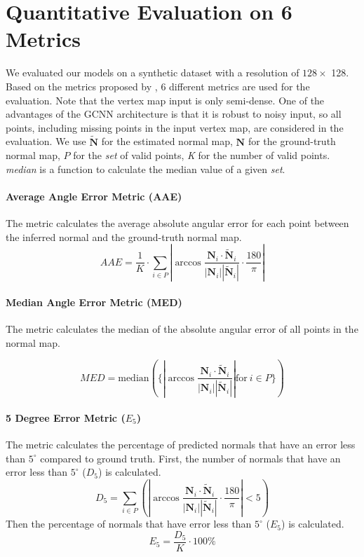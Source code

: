 \section{Quantitative Evaluation on 6 Metrics}
We evaluated our models on a synthetic dataset with a resolution of $ 128 \times $ 128. 
Based on the metrics proposed by \cite{geometry_based_solution}, 6 different metrics are used for the evaluation. Note that the vertex map input is only semi-dense. One of the advantages of the GCNN architecture is that it is robust to noisy input, so all points, including missing points in the input vertex map, are considered in the evaluation. We use $\tilde{\textbf{N}}$ for the estimated normal map, $ \textbf{N} $ for the ground-truth normal map, $ P $ for the \textit{set} of valid points, \textit{K} for the number of valid points. \textit{median} is a function to calculate the median value of a given \textit{set}.



\paragraph{Average Angle Error Metric (AAE)}
The metric calculates the average absolute angular error for each point between the inferred normal and the ground-truth normal map.
\[ 
AAE = \frac
{1}
{K} \cdot \sum_{i\in P}  \left|   \arccos \frac{\textbf{N}_{i}\cdot \tilde{\textbf{N}}_{i}} {| \textbf{N}_{i} |  |\tilde{\textbf{N}}_{i}|  } \cdot  \frac{180}{\pi}   \right| 
\]

\paragraph{Median Angle Error Metric (MED)}
The metric calculates the median of the absolute angular error of all points in the normal map.

\[ 
MED = 
\text{median}   \left( \Bigg\{ \left|\arccos \frac{\textbf{N}_{i}\cdot \tilde{\textbf{N}}_{i}} {| \textbf{N}_{i} |  |\tilde{\textbf{N}}_{i}|  } \right| \text{for}\ i \in P   \Bigg\}\right)
\]

\paragraph{5 Degree Error Metric ($ E_5 $)}
The metric calculates the percentage of predicted normals that have an error less than $ 5^\circ $ compared to ground truth. First, the number of normals that have an error less than $ 5^\circ $ ($ D_5 $) is calculated.
\[
D_5 = \sum_{i\in P} \left( \left|   \arccos \frac{\textbf{N}_{i}\cdot \tilde{\textbf{N}}_{i}} {| \textbf{N}_{i} |  |\tilde{\textbf{N}}_{i}|  } \cdot  \frac{180}{\pi}   \right| < 5 \right)
\]
Then the percentage of normals that have error less than $ 5^\circ $ ($ E_5 $) is calculated.
\[ 
E_5 = \frac{D_5}{K}\cdot 100\%
\]



